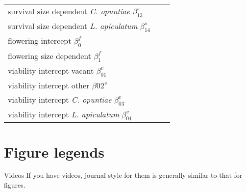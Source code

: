 \documentclass[11pt]{article}
\begin{document}
\begin{table}[]
\begin{tabular}{l|l|l}
    survival size dependent \textit{C. opuntiae} $\beta_{13}^s$ & & \\
    survival size dependent \textit{L. apiculatum} $\beta_{14}^s$ & & \\
    \hline
    flowering intercept $\beta_0^f$ & & \\
    flowering size dependent $\beta_1^f$ & & \\
    \hline
    viability intercept vacant $\beta_01^v$ & & \\
    viability intercept other $\beta02^v$ & & \\
    viability intercept \textit{C. opuntiae} $\beta_03^v$ & & \\
    viability intercept \textit{L. apiculatum} $\beta_04^v$ & & 
  \end{tabular}
  \end{table}

\section*{Figure legends}


 Videos
 If you have videos, journal style for them is generally similar to that for
 figures. 




\end{document}
